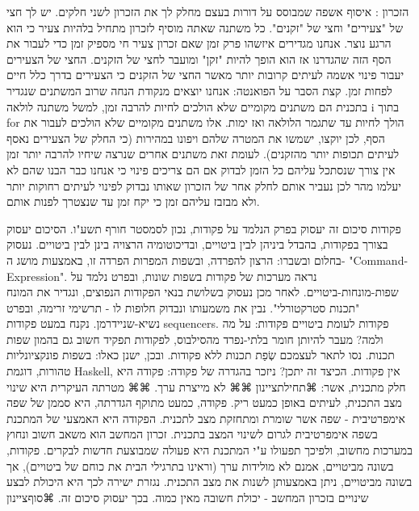         הזכרון
        :
        איסוף אשפה שמבוסס על דורות בעצם מחלק לך את הזכרון לשני חלקים. יש לך חצי של
        "צעירים" וחצי של "זקנים". כל משתנה שאתה מוסיף לזכרון מתחיל בלהיות צעיר כי הוא
        הרגע נוצר. אנחנו מגדירים איזשהו פרק זמן שאם זכרון צעיר חי מספיק זמן כדי לעבור
        את הסף הזה שהגדרנו אז הוא הופך להיות "זקן" ומועבר לחצי של הזקנים. החצי של
        הצעירים יעבור פינוי אשמה לעיתים קרובות יותר מאשר החצי של הזקנים כי הצעירים בדרך
        כלל חיים לפחות זמן. קצת הסבר על הפואנטה: אנחנו יוצאים מנקודת הנחה שרוב המשתנים
        שנגדיר בתכנית הם משתנים מקומיים שלא הולכים לחיות להרבה זמן, למשל משתנה לולאה i
        בתוך for הולך לחיות עד שתגמר הלולאה ואז ימות. אלו משתנים מקומיים שלא הולכים
        לעבור את הסף, לכן יוקצו, ישמשו את המטרה שלהם ויפונו במהירות (כי החלק של הצעירים
        נאסף לעיתים תכופות יותר מהזקנים). לעומת זאת משתנים אחרים שנרצה שיחיו להרבה
        יותר זמן אין צורך שנסתכל עליהם כל הזמן לבדוק אם הם צריכים פינוי כי אנחנו כבר
        הבנו שהם לא יעלמו מהר לכן נעביר אותם לחלק אחר של הזכרון שאותו נבדוק לפינוי
        לעיתים רחוקות יותר ולא מבזבז עליהם זמן כי יקח זמן עד שנצטרך לפנות אותם.

        פקודות
        סיכום זה יעסוק בפרק הנלמד על פקודות, נכון לסמסטר חורף תשע"ו. הסיכום יעסוק בצורך
        בפקודות, בהבדל ביניהן לבין ביטויים, ובדיכוטומיה הרצויה בינן לבין ביטויים. נעסוק
        בחלום ובשברו: הרצון להפרדה, ובשפות המפרות הפרדה זו, באמצעות מושג ה-
        "Command-Expression". נראה מערכות של פקודות בשפות שונות, ובפרט נלמד על
        שפות-מונחות-ביטויים. לאחר מכן נעסוק בשלושת בנאי הפקודות הנפוצים, ונגדיר את
        המונח "תכנות סטרקטורלי". נבין את משמעותו ונבדוק חלופות לו - תרשימי זרימה, ובפרט
        נשיא-שניידרמן. נקנח במעט פקודות sequencers. פקודות לעומת ביטויים
        פקודות: על מה ולמה?
        מעבר להיותן חומר בלתי-נפרד מהסילבוס, לפקודות תפקיד חשוב גם בהמון שפות תכנות. נסו לתאר לעצמכם שְׂפַת תכנות ללא פקודות. ובכן, ישנן כאלו: בשפות פונקציונליות טהורות, דוגמת Haskell, אין פקודות. הכיצד זה יתכן?
        ניזכר בהגדרה של פקודה:
        פקודה היא חלק מתכנית, אשר:
        ⌘תחילת{ציינון}
        ⌘⌘ לא מייצרת ערך.
        ⌘⌘ מטרתה העיקרית היא שינוי מצב התכנית, לעיתים באופן כמעט ריק.
        פקודה, כמעט מתוקף הגדרתה, היא סממן של שפה אימפרטיבית - שפה אשר שומרת ומתחזקת מצב לתכנית. הפקודה היא האמצעי של המתכנת בשפה אימפרטיבית לגרום לשינוי המצב בתכנית.
        זכרון המחשב הוא משאב חשוב ונחוץ במערכות מחשוב, ולפיכך תפעולו ע"י המתכנת היא פעולה שמבוצעת חדשות לבקרים. פקודות, בשונה מביטויים, אמנם לא מולידות ערך (וראינו בתרגילי הבית את כוחם של ביטויים), אך בשונה מביטויים, ניתן באמצעותן לשנות את מצב התכנית. נגזרת ישירה לכך היא היכולת לבצע שינויים בזכרון המחשב - יכולת חשובה מאין כמוה. בכך יעסוק סיכום זה.
    ⌘סוף{ציינון}

